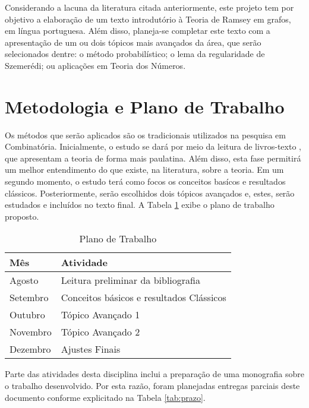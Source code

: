 \documentclass[a4paper,10pt]{article}
\begin{document}
Considerando a lacuna da literatura citada anteriormente, este projeto tem por objetivo a elaboração de um texto introdutório à Teoria de Ramsey em grafos, em língua portuguesa. Além disso, planeja-se completar este texto com a apresentação de um ou dois tópicos mais avançados da área, que serão selecionados dentre: o método probabilístico; o lema da regularidade de Szemerédi; ou aplicações em Teoria dos Números.


\section{Metodologia e Plano de Trabalho}

Os métodos que serão aplicados são os tradicionais utilizados na pesquisa em Combinatória. Inicialmente, o estudo se dará por meio da leitura de livros-texto \cite{alon, bollobas, bondy, diestel, graham, graham_rudiments, nesetril}, que apresentam a teoria de forma mais paulatina. Além disso, esta fase permitirá um melhor entendimento do que existe, na literatura, sobre a teoria. Em um segundo momento, o estudo terá como focos os conceitos basícos e resultados clássicos. Posteriormente, serão escolhidos dois tópicos avançados e, estes, serão estudados e incluídos no texto final. A Tabela \ref{tab:plano} exibe o plano de  trabalho proposto.

\begin{table}[h!]
\centering
\caption{Plano de Trabalho}
\label{tab:plano}
\begin{tabular}{|l|l|}
\hline
Mês      & Atividade                                \\\hline\hline
Agosto   & Leitura preliminar da bibliografia       \\
Setembro & Conceitos básicos e resultados Clássicos \\
Outubro  & Tópico Avançado 1                        \\
Novembro & Tópico Avançado 2                        \\
Dezembro & Ajustes Finais                           \\\hline
\end{tabular}
\end{table}

Parte das atividades desta disciplina inclui a preparação de uma monografia sobre o trabalho desenvolvido. Por esta razão, foram planejadas entregas parciais deste documento conforme explicitado na Tabela \ref{tab:prazo}.
\end{document}
